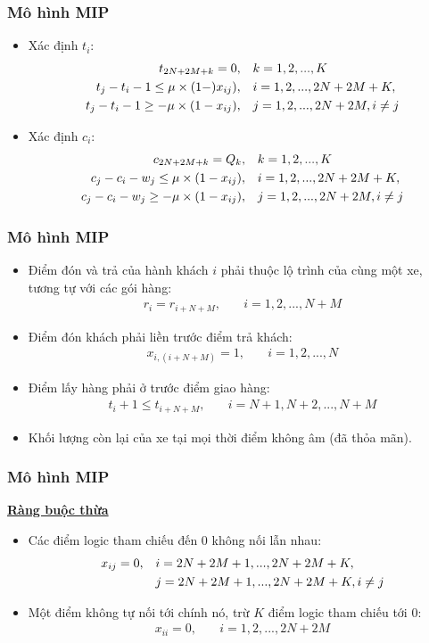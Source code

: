 \documentclass{beamer}
\begin{document}
	\begin{frame}
		\frametitle{Mô hình MIP}
		\begin{itemize}
			\item Xác định $t_i$:
			\begin{align}
				t_{2N+2M+k} = 0,\quad & k=1,2,...,K \\
				t_j - t_i -1\leq \mu\times (1 - )x_{ij}),\quad & i=1,2,...,2N+2M+K, \\
				t_j - t_i -1\geq -\mu\times (1 - x_{ij}),\quad & j=1,2,...,2N+2M, i\ne j \notag
			\end{align}
			\item Xác định $c_i$:
			\begin{align}
				c_{2N+2M+k} = Q_k,\quad & k=1,2,...,K \\
				c_j - c_i - w_j\leq \mu\times (1 - x_{ij}),\quad & i=1,2,...,2N+2M+K, \\
				c_j - c_i - w_j\geq -\mu\times (1 - x_{ij}),\quad & j=1,2,...,2N+2M, i\ne j \notag
			\end{align}
		\end{itemize}
	\end{frame}
	\begin{frame}
		\frametitle{Mô hình MIP}
		\begin{itemize}
			\item Điểm đón và trả của hành khách $i$ phải thuộc lộ trình của cùng một xe, tương tự với các gói hàng:
			\begin{align}
				r_i = r_{i+N+M},\quad & i=1,2,...,N+M
			\end{align}
			\item Điểm đón khách phải liền trước điểm trả khách:
			\begin{align}
				x_{i,(i+N+M)} = 1,\quad & i=1,2,...,N
			\end{align}
			\item Điểm lấy hàng phải ở trước điểm giao hàng:
			\begin{align}
				t_i + 1\leq t_{i+N+M},\quad & i=N+1,N+2,...,N+M
			\end{align}
			\item Khối lượng còn lại của xe tại mọi thời điểm không âm (đã thỏa mãn).
		\end{itemize}
	\end{frame}
	\begin{frame}
		\frametitle{Mô hình MIP}
		\textbf{\underline{Ràng buộc thừa}}
		\begin{itemize}
			\item Các điểm logic tham chiếu đến $0$ không nối lẫn nhau:
			\begin{align}
				x_{ij}=0,\quad & i=2N+2M+1,...,2N+2M+K, \\
				& j=2N+2M+1,...,2N+2M+K, i\ne j \notag
			\end{align}
			\item Một điểm không tự nối tới chính nó, trừ $K$ điểm logic tham chiếu tới $0$:
			\begin{align}
				x_{ii}=0,\quad & i=1,2,...,2N+2M
			\end{align}
		\end{itemize}
	\end{frame}
\end{document}
